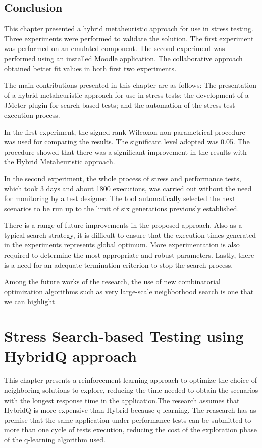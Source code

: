 \documentclass{report}
\begin{document}
\section{Conclusion}

This chapter presented a hybrid metaheuristic approach for use in stress testing. Three experiments were performed to validate the solution. The first experiment was performed on an emulated component. The second experiment was performed using an installed Moodle application.  The collaborative approach obtained better fit values in both first two experiments.

The main contributions presented in this chapter are as follows: The presentation of a hybrid metaheuristic approach for use in stress tests; the development of a JMeter plugin  for search-based tests; and  the automation of the stress test execution process.

In the first experiment, the signed-rank Wilcoxon non-parametrical procedure was used for comparing the results. The significant level adopted was 0.05. The procedure showed that there was a significant improvement in the results with the Hybrid Metaheuristic approach.

In the second experiment, the whole process of stress and performance tests, which took 3 days and about 1800 executions, was carried out without the need for monitoring by a test designer. The tool automatically selected the next scenarios to be run up to the limit of six generations previously established.

There is a range of future improvements in the proposed approach. Also as a typical search strategy, it is difficult to ensure that the execution times generated in the experiments represents global optimum. More experimentation is also required to determine the
most appropriate and robust parameters. Lastly, there is a need for an adequate termination criterion to stop the search process.

Among the future works of the research, the use of new combinatorial optimization algorithms such as very large-scale neighborhood search is one that we can highlight


\chapter{Stress Search-based Testing using HybridQ approach}


This chapter presents a reinforcement learning approach to optimize the choice of neighboring solutions to explore, reducing the time needed to obtain the scenarios with the longest response time in the application.The research assumes that HybridQ is more expensive than Hybrid because q-learning. The reasearch has as premise that the same application under performance tests can be submitted to more than one cycle of tests execution, reducing the cost of the exploration phase of the q-learning algorithm used.
\end{document}
